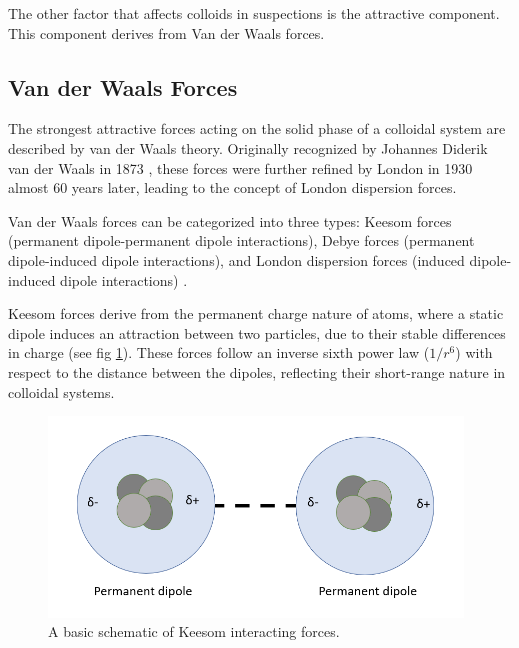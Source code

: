 The other factor that affects colloids in suspections is the attractive component. This component derives from Van der Waals forces.





\subsection{Van der Waals Forces}


The strongest attractive forces acting on the solid phase of a colloidal system are described by van der Waals theory. Originally recognized by Johannes Diderik van der Waals in 1873 \cite{vanderWaals}, these forces were further refined by London in 1930 \cite{London} almost 60 years later, leading to the concept of London dispersion forces. 

Van der Waals forces can be categorized into three types: Keesom forces (permanent dipole-permanent dipole interactions), Debye forces (permanent dipole-induced dipole interactions), and London dispersion forces (induced dipole-induced dipole interactions) \cite{sciDirBook}. 

Keesom forces derive from the permanent charge nature of atoms, where a static dipole induces an attraction between two particles, due to their stable differences in charge (see fig \ref{fig:keesom}). These forces follow an inverse sixth power law (\(1/r^6\)) with respect to the distance between the dipoles, reflecting their short-range nature in colloidal systems.

\begin{figure}[h!!!!!!!!!!!!!!!!!!!!!!!!!]     %
        \begin{center}
          \includegraphics[width=110mm]{chapter1/keesom.PNG}
\end{center}
\caption{A basic schematic of Keesom interacting forces.}
\label{fig:keesom}                 %
\end{figure}

